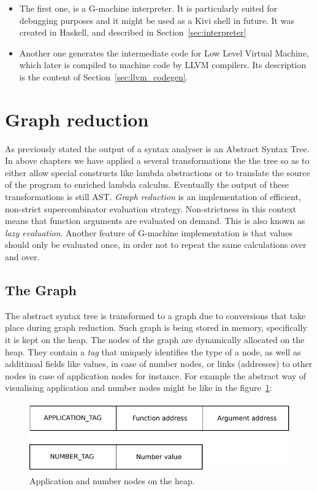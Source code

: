 \documentclass[12pt,a4paper]{report}
\begin{document}
\begin{itemize}
  \item The first one, is a G-machine interpreter. It is particularly suited
    for debugging purposes and it might be used as a Kivi shell in future. It
    was created in Haskell, and described in Section~\ref{sec:interpreter}
  \item Another one generates the intermediate code for Low Level Virtual
    Machine, which later is compiled to machine code by LLVM compilers. Its
    description is the content of Section~\ref{sec:llvm_codegen}.
\end{itemize}

\section{Graph reduction}
\label{sec:graph_reduction}
As previously stated the output of a syntax analyser is an Abstract Syntax
Tree. In above chapters we have applied a several transformations the the tree
so as to either allow special constructs like lambda abstractions or to
translate the source of the program to enriched lambda calculus. Eventually the
output of these transformations is still AST. \textit{Graph reduction} is an
implementation of efficient, non-strict supercombinator evaluation strategy.
Non-strictness in this context means that function arguments are evaluated on
demand. This is also known as \textit{lazy evaluation}. Another feature of
G-machine implementation is that values should only be evaluated once, in order
not to repeat the same calculations over and over.

\subsection{The Graph}
The abstract syntax tree is transformed to a graph due to conversions that take
place during graph reduction. Such graph is being stored in memory,
specifically it is kept on the heap. The nodes of the graph are dynamically
allocated on the heap. They contain a \textit{tag} that uniquely identifies the
type of a node, as well as additinoal fields like values, in case of number
nodes, or links (addresses) to other nodes in case of application nodes for
instance. For example the abstract way of visualising application and number
nodes might be like in the figure~\ref{fig:num_ap_nodes}:

\vspace*{0.2in}
\begin{figure}[h!]
  \centering
  \includegraphics[height=3cm]{nodes}
  \caption{Application and number nodes on the heap.}
  \label{fig:num_ap_nodes}
\end{figure}
\end{document}
